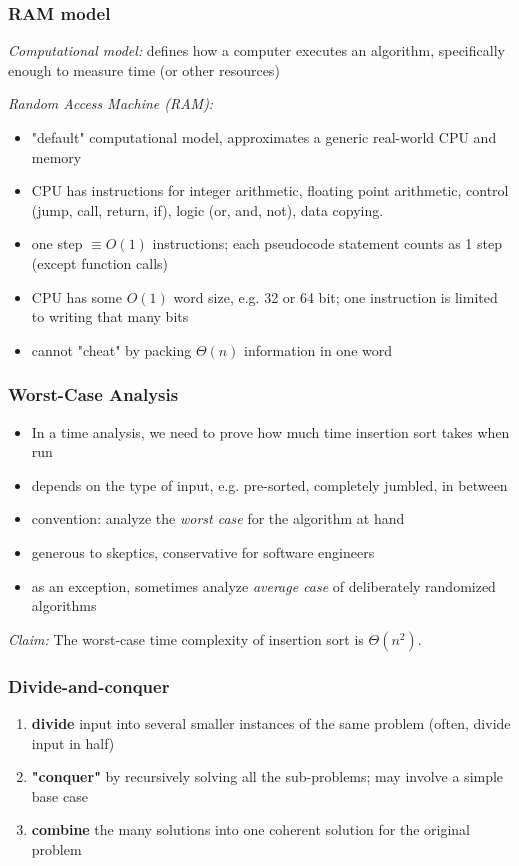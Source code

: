 \documentclass{beamer}
\begin{document}
\begin{frame} \frametitle{RAM model}
  \emph{Computational model:} defines how a computer executes an algorithm,
    specifically enough to measure time (or other resources)

  \emph{Random Access Machine (RAM):}
  \begin{itemize}
    \item "default" computational model, approximates a generic real-world
      CPU and memory
    \item CPU has instructions for integer arithmetic, floating point arithmetic,
      control (jump, call, return, if), logic (or, and, not), data copying.
    \item one step $\equiv O(1)$ instructions; each pseudocode statement counts
      as 1 step (except function calls)
    \item CPU has some $O(1)$ word size, e.g. 32 or 64 bit; one instruction
      is limited to writing that many bits
    \item cannot "cheat" by packing $\Theta(n)$ information in one word
  \end{itemize}
\end{frame}

\begin{frame} \frametitle{Worst-Case Analysis}
  \begin{itemize}
  \item In a time analysis, we need to prove how much time insertion sort
    takes when run
  \item depends on the type of input, e.g. pre-sorted, completely jumbled,
    in between
  \item convention: analyze the \emph{worst case} for the algorithm at hand
  \item generous to skeptics, conservative for software engineers
  \item as an exception, sometimes analyze \emph{average case} of
    deliberately randomized algorithms
  \end{itemize}

  \emph{Claim:} The worst-case time complexity of insertion sort is
    $\Theta(n^2).$

\end{frame}

\begin{frame} \frametitle{Divide-and-conquer}
  \begin{enumerate}
    \item \textbf{divide} input into several smaller instances of the same
      problem (often, divide input in half)
    \item \textbf{"conquer"} by recursively solving all the sub-problems;
      may involve a simple base case
    \item \textbf{combine} the many solutions into one coherent solution for
      the original problem
  \end{enumerate}
\end{frame}
\end{document}
